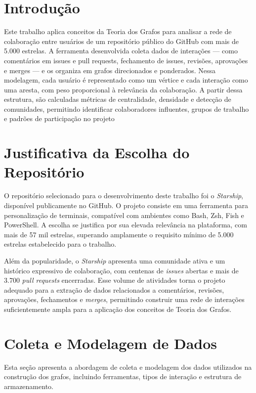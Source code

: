 \documentclass[12pt]{article}
\begin{document}
\newpage

\section{Introdução}

Este trabalho aplica conceitos da Teoria dos Grafos para analisar a rede de colaboração entre usuários de um repositório público do GitHub com mais de 5.000 estrelas. A ferramenta desenvolvida coleta dados de interações — como comentários em issues e pull requests, fechamento de issues, revisões, aprovações e merges — e os organiza em grafos direcionados e ponderados. Nessa modelagem, cada usuário é representado como um vértice e cada interação como uma aresta, com peso proporcional à relevância da colaboração. A partir dessa estrutura, são calculadas métricas de centralidade, densidade e detecção de comunidades, permitindo identificar colaboradores influentes, grupos de trabalho e padrões de participação no projeto
\section{Justificativa da Escolha do Repositório} \label{Justificativa da Escolha do Repositório}

O repositório selecionado para o desenvolvimento deste trabalho foi o \textit{Starship},
disponível publicamente no GitHub. O projeto consiste em uma ferramenta para personalização
de terminais, compatível com ambientes como Bash, Zsh, Fish e PowerShell. A escolha se
justifica por sua elevada relevância na plataforma, com mais de 57 mil estrelas, superando
amplamente o requisito mínimo de 5.000 estrelas estabelecido para o trabalho.

Além da popularidade, o \textit{Starship} apresenta uma comunidade ativa e um histórico
expressivo de colaboração, com centenas de \textit{issues} abertas e mais de 3.700
\textit{pull requests} encerradas. Esse volume de atividades torna o projeto adequado para
a extração de dados relacionados a comentários, revisões, aprovações, fechamentos e
\textit{merges}, permitindo construir uma rede de interações suficientemente ampla para
a aplicação dos conceitos de Teoria dos Grafos.


\section{Coleta e Modelagem de Dados}

Esta seção apresenta a abordagem de coleta e modelagem dos dados utilizados na construção dos grafos, incluindo ferramentas, tipos de interação e estrutura de armazenamento.
\end{document}

